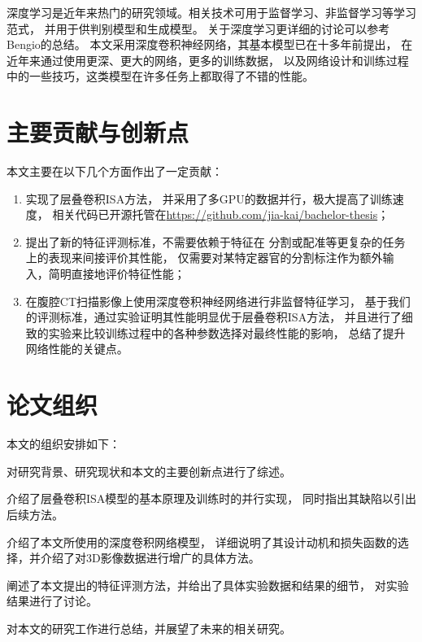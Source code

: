 深度学习是近年来热门的研究领域。相关技术可用于监督学习、非监督学习等学习范式，
并用于供判别模型和生成模型。
关于深度学习更详细的讨论可以参考Bengio的总结\cite{bengio2009learning}。
本文采用深度卷积神经网络，其基本模型已在十多年前提出\cite{lecun1998gradient}，
在近年来通过使用更深、更大的网络，更多的训练数据，
以及网络设计和训练过程中的一些技巧，这类模型在许多任务上都取得了不错的性能。


\section{主要贡献与创新点}
本文主要在以下几个方面作出了一定贡献：

\begin{enumerate}
    \item 实现了层叠卷积ISA方法\cite{wu2013unsupervised}，
        并采用了多GPU的数据并行，极大提高了训练速度，
        相关代码已开源托管在\url{https://github.com/jia-kai/bachelor-thesis}；
    \item 提出了新的特征评测标准，不需要依赖于特征在
        分割或配准等更复杂的任务上的表现来间接评价其性能，
        仅需要对某特定器官的分割标注作为额外输入，简明直接地评价特征性能；
    \item 在腹腔CT扫描影像上使用深度卷积神经网络进行非监督特征学习，
        基于我们的评测标准，通过实验证明其性能明显优于层叠卷积ISA方法，
        并且进行了细致的实验来比较训练过程中的各种参数选择对最终性能的影响，
        总结了提升网络性能的关键点。
\end{enumerate}

\section{论文组织}
本文的组织安排如下：

对研究背景、研究现状和本文的主要创新点进行了综述。

介绍了层叠卷积ISA模型的基本原理及训练时的并行实现，
同时指出其缺陷以引出后续方法。

介绍了本文所使用的深度卷积网络模型，
详细说明了其设计动机和损失函数的选择，并介绍了对3D影像数据进行增广的具体方法。

阐述了本文提出的特征评测方法，并给出了具体实验数据和结果的细节，
对实验结果进行了讨论。

对本文的研究工作进行总结，并展望了未来的相关研究。

